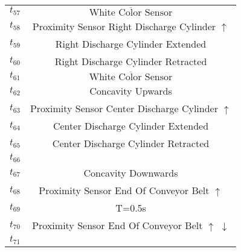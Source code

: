 \begin{table}[htbp]
\begin{tabular}{cc}
\hyperlink{partialNet:t57}{\hypertarget{partialTable:t57}{$t_{57}$}} & \(\overline{\mbox{White Color Sensor}}\)\\
\hyperlink{partialNet:t58}{\hypertarget{partialTable:t58}{$t_{58}$}} & Proximity Sensor Right Discharge Cylinder \(\uparrow\)\\
\hyperlink{partialNet:t59}{\hypertarget{partialTable:t59}{$t_{59}$}} & Right Discharge Cylinder Extended\\
\hyperlink{partialNet:t60}{\hypertarget{partialTable:t60}{$t_{60}$}} & Right Discharge Cylinder Retracted\\
\hyperlink{partialNet:t61}{\hypertarget{partialTable:t61}{$t_{61}$}} & \(\overline{\mbox{White Color Sensor}}\)\\
\hyperlink{partialNet:t62}{\hypertarget{partialTable:t62}{$t_{62}$}} & Concavity Upwards\\
\hyperlink{partialNet:t63}{\hypertarget{partialTable:t63}{$t_{63}$}} & Proximity Sensor Center Discharge Cylinder \(\uparrow\)\\
\hyperlink{partialNet:t64}{\hypertarget{partialTable:t64}{$t_{64}$}} & Center Discharge Cylinder Extended\\
\hyperlink{partialNet:t65}{\hypertarget{partialTable:t65}{$t_{65}$}} & Center Discharge Cylinder Retracted\\
\hyperlink{partialNet:t66}{\hypertarget{partialTable:t66}{$t_{66}$}} & \\
\hyperlink{partialNet:t67}{\hypertarget{partialTable:t67}{$t_{67}$}} & Concavity Downwards\\
\hyperlink{partialNet:t68}{\hypertarget{partialTable:t68}{$t_{68}$}} & Proximity Sensor End Of Conveyor Belt \(\uparrow\)\\
\hyperlink{partialNet:tt69}{\hypertarget{partialTable:tt69}{$t_{69}$}} & T=0.5s\\
\hyperlink{partialNet:t70}{\hypertarget{partialTable:t70}{$t_{70}$}} & Proximity Sensor End Of Conveyor Belt \(\uparrow\)       \(\downarrow\)\\
\hyperlink{partialNet:t71}{\hypertarget{partialTable:t71}{$t_{71}$}} & \\
\end{tabular}
\end{table}

